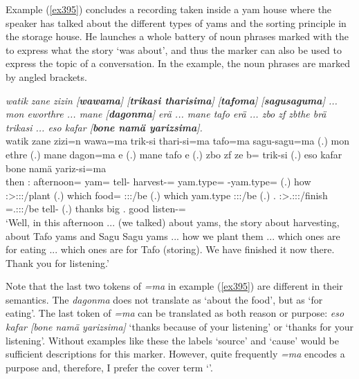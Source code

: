 Example (\ref{ex395}) concludes a recording taken inside a yam house where the speaker has talked about the different types of yams and the sorting principle in the storage house. He launches a whole battery of noun phrases marked with the   to express what the story `was about', and thus the  marker can also be used to express the topic of a conversation. In the example, the noun phrases are marked by angled brackets.

\begin{exe}
	\ex \emph{watik zane zizin [\textbf{wawama}] [\textbf{trikasi tharisima}] [\textbf{tafoma}] [\textbf{sagusaguma}] ... mon eworthre ... mane [\textbf{dagonma}] erä ... mane tafo erä ... zbo zf zbthe brä trikasi ... eso kafar [\textbf{bone namä yarizsima}].}\\
	\gll watik zane zizi=n wawa=ma trik-si thari-si=ma tafo=ma sagu-sagu=ma (.) mon ethre (.) mane dagon=ma e (.) mane tafo e (.) zbo zf ze b= trik-si (.) eso kafar bone namä yariz-si=ma\\
	then \Dem:{\Prox} afternoon={\Loc} yam={\Char} tell-{\Nmlz} harvest-\Nmlz={\Char} yam.type={\Char} \Redup-yam.type={\Char} (.) how \Fpl:\Sbj>\Stpl:\Obj:\Nonpast:\Ipfv/plant (.) which food={\Char} \Stpl:\Sbj:\Nonpast:\Ipfv/be (.) which yam.type \Stpl:\Sbj:\Nonpast:\Ipfv/be (.) \Prox.{\All} {\Imm} \Fdu:\Sbj>\Tsg.\F:\Obj:\Rpst:\Pfv/finish \Med=\Tsg.\F:\Sbj:\Nonpast:\Ipfv/be tell-{\Nmlz} (.) thanks big \Ssg.{\Poss} good listen-\Nmlz={\Char}\\
	\trans `Well, in this afternoon ... (we talked) about yams, the story about harvesting, about Tafo yams and Sagu Sagu yams ... how we plant them ... which ones are for eating ... which ones are for Tafo (storing). We have finished it now there. Thank you for listening.'
	\label{ex395}
\end{exe}

Note that the last two tokens of \emph{=ma} in example (\ref{ex395}) are different in their semantics. The  \emph{dagonma} does not translate as `about the food', but as `for eating'. The last token of \emph{=ma} can be translated as both reason or purpose: \emph{eso kafar [bone namä yarizsima]} `thanks because of your listening' or `thanks for your listening'. Without examples like these the labels `source' and `cause' would be sufficient descriptions for this  marker. However, quite frequently \emph{=ma} encodes a purpose and, therefore, I prefer the cover term `'.

